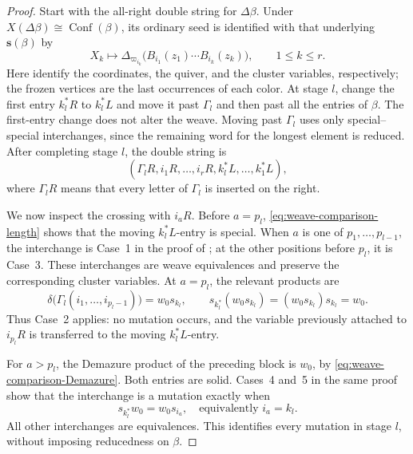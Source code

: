 \documentclass[12pt, reqno]{amsart}
\theoremstyle{plain}
\theoremstyle{definition}
\numberwithin{equation}{section}
\begin{document}
\begin{proof}
Start with the all-right double string for \(\Delta\beta\).
Under \(X(\Delta\beta)\cong\operatorname{Conf}(\beta)\), its ordinary
seed is identified with that underlying \(\mathbf s(\beta)\) by
\[
X_k\longmapsto
\Delta_{\varpi_{i_k}}\bigl(B_{i_1}(z_1)\cdots B_{i_k}(z_k)\bigr),
\qquad 1\leq k\leq r.
\]
Here \cite[Lemma~3.16, Corollary~4.45 and Proposition~5.20]{casals2025cluster}
identify the coordinates, the quiver, and the cluster variables,
respectively; the frozen vertices are the last occurrences of each color.
At stage \(l\), change the first entry \(k_l^*R\) to \(k_l^*L\)
and move it past \(\Gamma_l\) and then past all the entries of \(\beta\).
The first-entry change does not alter the weave. Moving past \(\Gamma_l\)
uses only special--special interchanges, since the remaining word
for the longest element is reduced. After completing stage \(l\),
the double string is
\begin{equation}\label{eq:comparison-double-string-l}
(\Gamma_lR,i_1R,\ldots,i_rR,k_l^*L,\ldots,k_1^*L),
\end{equation}
where \(\Gamma_lR\) means that every letter of \(\Gamma_l\) is inserted on
the right.

We now inspect the crossing with \(i_aR\). Before \(a=p_l\),
\eqref{eq:weave-comparison-length} shows that the moving
\(k_l^*L\)-entry is special. When \(a\) is one of
\(p_1,\ldots,p_{l-1}\), the interchange is Case~1 in the proof
of \cite[Theorem~6.8]{casals2025cluster}; at the other positions
before \(p_l\), it is Case~3. These interchanges are weave
equivalences and preserve the corresponding cluster variables.
At \(a=p_l\), the relevant products are
\[
\delta\bigl(\Gamma_l(i_1,\ldots,i_{p_l-1})\bigr)=w_0s_{k_l},
\qquad
s_{k_l^*}(w_0s_{k_l})=(w_0s_{k_l})s_{k_l}=w_0.
\]
Thus Case~2 applies: no mutation occurs, and the variable previously
attached to \(i_{p_l}R\) is transferred to the moving
\(k_l^*L\)-entry.

For \(a>p_l\), the Demazure product of the preceding block is
\(w_0\), by \eqref{eq:weave-comparison-Demazure}. Both entries
are solid. Cases~4 and~5 in the same proof show that the interchange
is a mutation exactly when
\[
s_{k_l^*}w_0=w_0s_{i_a},\quad\text{equivalently }i_a=k_l.
\]
All other interchanges are equivalences. This identifies every
mutation in stage \(l\), without imposing reducedness on \(\beta\).


\end{proof}
\end{document}
